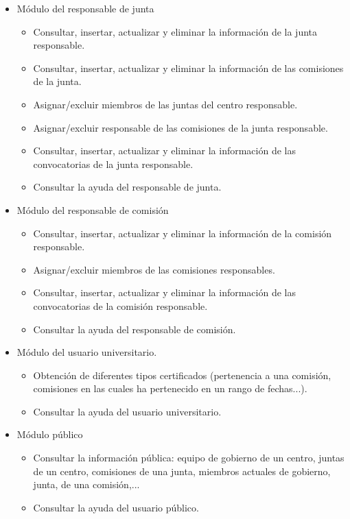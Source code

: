 \begin{itemize}
\begin{itemize}
             \item Módulo del responsable de junta
                \begin{itemize}
                    \item Consultar, insertar, actualizar y eliminar la información de la junta responsable.
                    \item Consultar, insertar, actualizar y eliminar la información de las comisiones de la junta.
                    \item Asignar/excluir miembros de las juntas del centro responsable.
                    \item Asignar/excluir responsable de las comisiones de la junta responsable.
                    \item Consultar, insertar, actualizar y eliminar la información de las convocatorias de la junta responsable.
                \item Consultar la ayuda del responsable de junta.
                \end{itemize}

             \item Módulo del responsable de comisión
                \begin{itemize}
                    \item Consultar, insertar, actualizar y eliminar la información de la comisión responsable.
                    \item Asignar/excluir miembros de las comisiones responsables.
                    \item Consultar, insertar, actualizar y eliminar la información de las convocatorias de la comisión responsable.
                \item Consultar la ayuda del responsable de comisión.
                \end{itemize}

            \item Módulo del usuario universitario.
                \begin{itemize}
                    \item Obtención de diferentes tipos certificados (pertenencia a una comisión, comisiones en las cuales ha pertenecido en un rango de fechas...).
                \item Consultar la ayuda del usuario universitario.
                \end{itemize}
         
         \item Módulo público
            \begin{itemize}
                \item Consultar la información pública: equipo de gobierno de un centro, juntas de un centro, comisiones de una junta, miembros actuales de gobierno, junta, de una comisión,...
                \item Consultar la ayuda del usuario público.
            \end{itemize}
        

\end{itemize}
\end{itemize}
